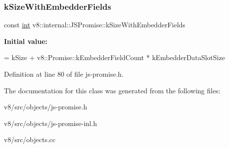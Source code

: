 \subsubsection{\texorpdfstring{k\+Size\+With\+Embedder\+Fields}{kSizeWithEmbedderFields}}
{\footnotesize\ttfamily const \mbox{\hyperlink{classint}{int}} v8\+::internal\+::\+J\+S\+Promise\+::k\+Size\+With\+Embedder\+Fields\hspace{0.3cm}{\ttfamily [static]}}

{\bfseries Initial value\+:}
\begin{DoxyCode}
=
      kSize + v8::Promise::kEmbedderFieldCount * kEmbedderDataSlotSize
\end{DoxyCode}


Definition at line 80 of file js-\/promise.\+h.



The documentation for this class was generated from the following files\+:\begin{DoxyCompactItemize}
\item 
v8/src/objects/js-\/promise.\+h\item 
v8/src/objects/js-\/promise-\/inl.\+h\item 
v8/src/objects.\+cc\end{DoxyCompactItemize}

